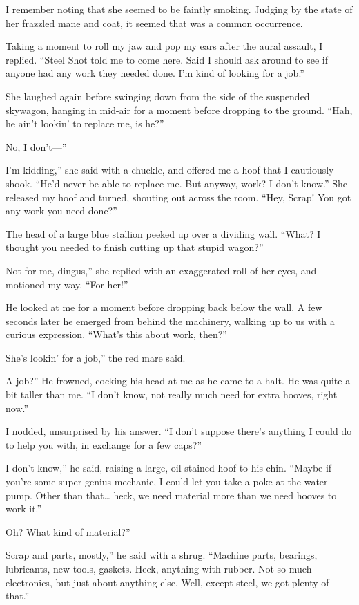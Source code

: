 I remember noting that she seemed to be faintly smoking. Judging by the state of her frazzled mane and coat, it seemed that was a common occurrence.

Taking a moment to roll my jaw and pop my ears after the aural assault, I replied. “Steel Shot told me to come here. Said I should ask around to see if anyone had any work they needed done. I’m kind of looking for a job.”

She laughed again before swinging down from the side of the suspended skywagon, hanging in mid-air for a moment before dropping to the ground. “Hah, he ain’t lookin’ to replace me, is he?”

\leavevmode{}No, I don’t—”

\leavevmode{}I’m kidding,” she said with a chuckle, and offered me a hoof that I cautiously shook. “He’d never be able to replace me. But anyway, work? I don’t know.” She released my hoof and turned, shouting out across the room. “Hey, Scrap! You got any work you need done?”

The head of a large blue stallion peeked up over a dividing wall. “What? I thought you needed to finish cutting up that stupid wagon?”

\leavevmode{}Not for me, dingus,” she replied with an exaggerated roll of her eyes, and motioned my way. “For her!”

He looked at me for a moment before dropping back below the wall. A few seconds later he emerged from behind the machinery, walking up to us with a curious expression. “What’s this about work, then?”

\leavevmode{}She’s lookin’ for a job,” the red mare said.

\leavevmode{}A job?” He frowned, cocking his head at me as he came to a halt. He was quite a bit taller than me. “I don’t know, not really much need for extra hooves, right now.”

I nodded, unsurprised by his answer. “I don’t suppose there’s anything I could do to help you with, in exchange for a few caps?”

\leavevmode{}I don’t know,” he said, raising a large, oil-stained hoof to his chin. “Maybe if you’re some super-genius mechanic, I could let you take a poke at the water pump. Other than that… heck, we need material more than we need hooves to work it.”

\leavevmode{}Oh? What kind of material?”

\leavevmode{}Scrap and parts, mostly,” he said with a shrug. “Machine parts, bearings, lubricants, new tools, gaskets. Heck, anything with rubber. Not so much electronics, but just about anything else. Well, except steel, we got plenty of that.”

